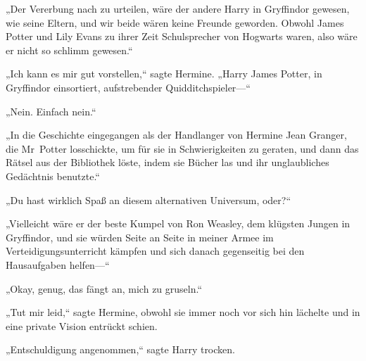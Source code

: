 „Der Vererbung nach zu urteilen, wäre der andere Harry in Gryffindor gewesen, wie seine Eltern, und wir beide wären keine Freunde geworden. Obwohl James Potter und Lily Evans zu ihrer Zeit Schulsprecher von Hogwarts waren, also wäre er nicht so schlimm gewesen.“

„Ich kann es mir gut vorstellen,“ sagte Hermine. „Harry James Potter, in Gryffindor einsortiert, aufstrebender Quidditchspieler—“

„Nein. Einfach nein.“

„In die Geschichte eingegangen als der Handlanger von Hermine Jean Granger, die Mr~Potter losschickte, um für sie in Schwierigkeiten zu geraten, und dann das Rätsel aus der Bibliothek löste, indem sie Bücher las und ihr unglaubliches Gedächtnis benutzte.“

„Du hast wirklich Spaß an diesem alternativen Universum, oder?“

„Vielleicht wäre er der beste Kumpel von Ron Weasley, dem klügsten Jungen in Gryffindor, und sie würden Seite an Seite in meiner Armee im Verteidigungsunterricht kämpfen und sich danach gegenseitig bei den Hausaufgaben helfen—“

„Okay, genug, das fängt an, mich zu gruseln.“

„Tut mir leid,“ sagte Hermine, obwohl sie immer noch vor sich hin lächelte und in eine private Vision entrückt schien.

„Entschuldigung angenommen,“ sagte Harry trocken.

